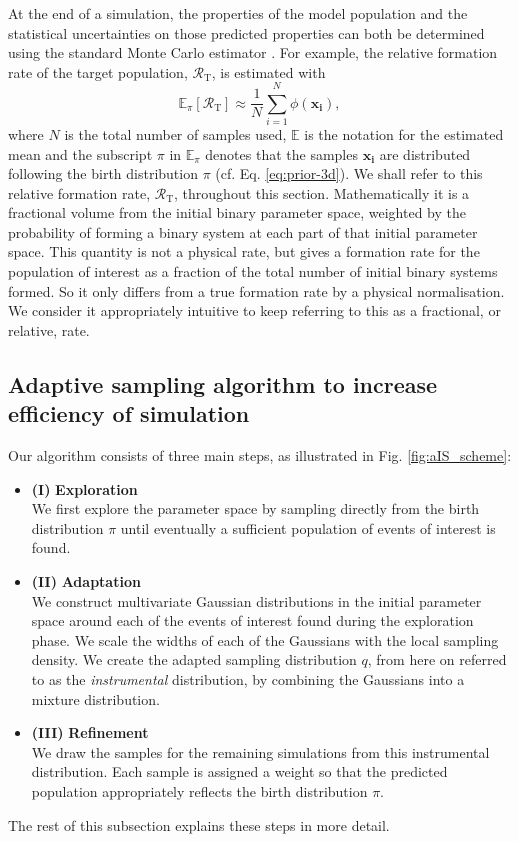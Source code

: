 \documentclass[a4paper,fleqn,usenatbib,useAMS,usedcolumn]{mnras}
\newcommand\rate{\mathcal{R}}
\begin{document}
At the end of a simulation, the properties of the model population and the statistical uncertainties on those predicted properties can both be determined 
using the standard Monte Carlo estimator  \citep{osti_4423221,doi:10.1080/01621459.1949.10483310}. For example, the relative formation rate of the target population, $\rate_{\text{T}}$, is estimated with
\begin{equation}
\mathbb{E}_{\pi}[\rate_{\text{T}}] \approx  \frac{1}{N_{\text{}}} \sum_{i=1}^{N_{\text{}}} \phi(\boldsymbol{x_i}),   %
	\label{eq:unbiased}
\end{equation}
where $N$ is the total number of samples used, $\mathbb{E}$ is the notation for the estimated mean and the subscript $\pi$ in $\mathbb{E}_{\pi}$ denotes that the samples $\boldsymbol{x_i}$ are distributed following the birth distribution $\pi$ (cf. Eq. \ref{eq:prior-3d}).
We shall refer to this relative formation rate, $\rate_{\text{T}} $, throughout this section. Mathematically it is a fractional volume from the initial binary parameter space, weighted by the probability of forming a binary system at each part of that initial parameter space.  This quantity is not a physical rate, but gives a formation rate for the population of interest as a fraction of the total number of initial binary systems formed.  So it only differs from a true formation rate by a physical normalisation.  We consider it appropriately intuitive to keep referring to this as a fractional, or relative, rate.




\subsection{Adaptive sampling algorithm to increase efficiency of simulation}
\label{subsec:AISalgorithm}
Our algorithm consists of three main steps, as illustrated in Fig. \ref{fig:aIS_scheme}:
%
\begin{itemize}
	\item[]\textbf{(I)} \textbf{Exploration }\\  We first explore the parameter space by sampling directly from the birth distribution $\pi$ 
	 	 until eventually a sufficient population of events of interest is found. 
	\item[]\textbf{(II)} \textbf{Adaptation} \\ 
	 We construct multivariate Gaussian distributions in the initial parameter space around each of the events of interest found during the exploration phase.  We scale the widths of each of the Gaussians with the local sampling density. We create the adapted sampling distribution $q$, from here on referred to as the \emph{instrumental} distribution, by combining the Gaussians into a mixture distribution. 
	\item[]  \textbf{(III)} \textbf{Refinement} \\
	We draw the samples for the remaining simulations from this instrumental distribution. Each sample is assigned a weight so that the predicted population appropriately reflects the birth distribution $\pi$. 
\end{itemize}
%
The rest of this subsection explains these steps in more detail.
\end{document}
